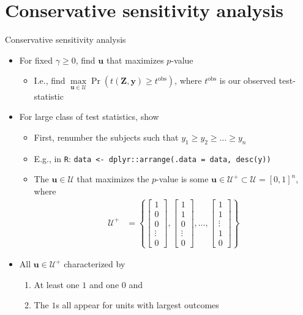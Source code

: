 \documentclass[table, xcolor={dvipsnames}, 9pt]{beamer}
\theoremstyle{newstyle}
\begin{document}
\section{Conservative sensitivity analysis}
\begin{frame}{Conservative sensitivity analysis}
\vfill
\begin{itemize} \vfill
\item For fixed $\gamma \geq 0$, find $\mathbf{u}$ that maximizes $p$-value  \vfill
\begin{itemize} \vfill
\item  I.e., find $\max \limits_{\mathbf{u} \in \mathcal{U}} \Pr\left(t\left(\mathbf{Z}, \mathbf{y}\right) \geq t^{\text{obs}} \right)$, where $t^{\text{obs}}$ is our observed test-statistic \vfill
\end{itemize}	\vfill
\item  For large class of test statistics, \citet{rosenbaumkrieger1990} show \vfill
\begin{itemize} \vfill
\item First, renumber the subjects such that $y_1 \geq y_2 \geq \ldots \geq y_n$  \vfill
\item[] E.g., in \texttt{R}: \texttt{data <- dplyr::arrange(.data = data, desc(y))} \vfill
\item The $\mathbf{u} \in \mathcal{U}$ that maximizes the $p$-value is some $\mathbf{u} \in \mathcal{U}^+ \subset \mathcal{U} = \left[0, 1\right]^n$, where  \vfill
\begin{align*}
\mathcal{U}^+ & = \left\{
\begin{bmatrix} 1 \\ 0 \\ 0 \\ \vdots \\ 0 \end{bmatrix},
\begin{bmatrix} 1 \\ 1 \\ 0 \\ \vdots \\ 0 \end{bmatrix},
\ldots , 
\begin{bmatrix} 1 \\ 1 \\ \vdots \\ 1 \\ 0 \end{bmatrix}
\right\}
\end{align*} \vfill
\end{itemize} \vfill
\item  All $\mathbf{u} \in \mathcal{U}^+$ characterized by \vfill
\begin{enumerate}
\item At least one $1$ and one $0$ and \vfill
\item The $1$s all appear for units with largest outcomes \vfill
\end{enumerate}
\end{itemize} \vfill
\end{frame}
\end{document}
